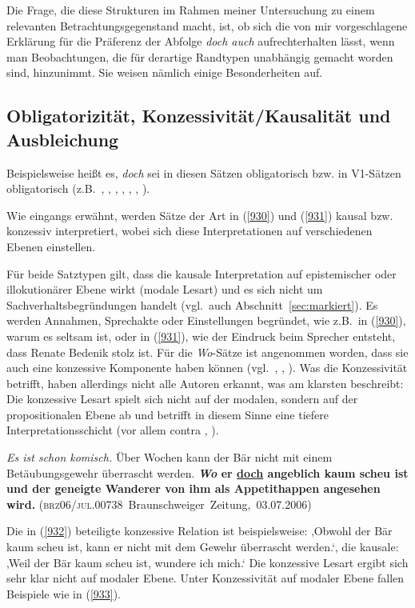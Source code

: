{Die Frage, die diese Strukturen im Rahmen meiner Untersuchung zu einem re\-levanten Betrachtungsgegenstand macht, ist, ob sich die von mir vorgeschlagene Erklärung für die Präferenz der Abfolge \textit{doch auch} aufrechterhalten lässt, wenn man Beobachtungen, die für derartige Randtypen unabhängig gemacht worden sind, hinzunimmt. Sie weisen nämlich einige Besonderheiten auf.
																
\subsection{Obligatorizität, Konzessivität/Kausalität und Ausbleichung}
\label{sec:eig}
Beispielsweise heißt es, \textit{doch} sei in diesen Sätzen obligatorisch bzw. in V1-Sätzen obligatorisch (z.B.\ \citealt[36]{Winkler1992}, \citealt[1020]{Altmann1993}, \citealt[155/157]{Oennerfors1997}, \citealt[2299]{Zifonun1997}, \citealt[157]{Pittner2011}, \citealt[40/42]{Oppenrieder2013}, \citealt[640]{Thurmair2013}). 

Wie eingangs erwähnt, werden Sätze der Art in (\ref{930}) und (\ref{931}) kausal bzw. konzessiv interpretiert, wobei sich diese Interpretationen auf verschiedenen Ebenen einstellen.

Für beide Satztypen gilt, dass die kausale Interpretation auf epistemischer oder illokutionärer Ebene  wirkt (modale Lesart)  und es sich nicht um Sachverhaltsbegründungen handelt (vgl.\ auch Abschnitt~\ref{sec:markiert}). Es werden Annahmen, Sprechakte oder Einstellungen begründet, wie z.B.\ in (\ref{930}), warum es seltsam ist, oder in (\ref{931}), wie der Eindruck beim Sprecher entsteht, dass Renate Bedenik stolz ist. Für die \textit{Wo}-Sätze ist angenommen worden, dass sie auch eine konzessive Komponente haben können (vgl.\ \citealt[2312--2313]{Zifonun1997}, \citealt{Pasch1999}, \citealt{Guenthner2002}). Was die Konzessivität betrifft, haben allerdings nicht alle Autoren erkannt, was \citealt{Pasch1999} am klarsten beschreibt: Die konzessive Lesart spielt sich nicht auf der modalen, sondern auf der  propositionalen  Ebene ab und betrifft in diesem Sinne eine tiefere Interpretationsschicht (vor allem contra \citealt[2312--2313]{Zifonun1997}, \citealt{Guenthner2002}).

\begin{exe}
	\ex\label{932}

	\emph{Es ist schon komisch.} Über Wochen kann der Bär nicht mit einem Betäubungsgewehr überrascht werden. \textbf{\textit{Wo} er \ul{doch} 			angeblich kaum scheu ist und der geneigte Wanderer von ihm als Appetithappen angesehen wird. 		}		         
	\hbox{}\hfill\hbox{(\textsc{brz06/jul.00738} Braunschweiger Zeitung, 03.07.2006)}
\end{exe}	       											   
Die in (\ref{932}) beteiligte konzessive Relation ist beispielsweise: ‚Obwohl der Bär kaum scheu ist, kann er nicht mit dem Gewehr überrascht werden.‘, die kausale: ‚Weil der Bär kaum scheu ist, wundere ich mich.‘ Die konzessive Lesart ergibt sich sehr klar nicht auf modaler Ebene. Unter Konzessivität auf modaler Ebene fallen Beispiele wie in (\ref{933}).

}
